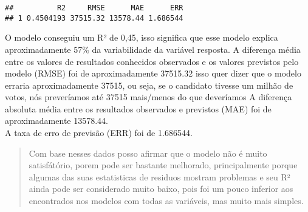 \documentclass[]{article}
\begin{document}
\begin{verbatim}
##          R2     RMSE      MAE      ERR
## 1 0.4504193 37515.32 13578.44 1.686544
\end{verbatim}

O modelo conseguiu um R² de 0,45, isso significa que esse modelo explica
aproximadamente 57\% da variabilidade da variável resposta. A diferença
média entre os valores de resultados conhecidos observados e os valores
previstos pelo modelo (RMSE) foi de aproximadamente 37515.32 isso quer
dizer que o modelo erraria aproximadamente 37515, ou seja, se o
candidato tivesse um milhão de votos, nós preveríamos até 37515
mais/menos do que deveríamos A diferença absoluta média entre os
resultados observados e previstos (MAE) foi de aproximadamente
13578.44.\\
A taxa de erro de previsão (ERR) foi de 1.686544.

\begin{quote}
Com base nesses dados posso afirmar que o modelo não é muito
satisfátório, porem pode ser bastante melhorado, principalmente porque
algumas das suas estatisticas de residuos mostram problemas e seu R²
ainda pode ser considerado muito baixo, pois foi um pouco inferior aos
encontrados nos modelos com todas as variáveis, mas muito mais simples.
\end{quote}
\end{document}
